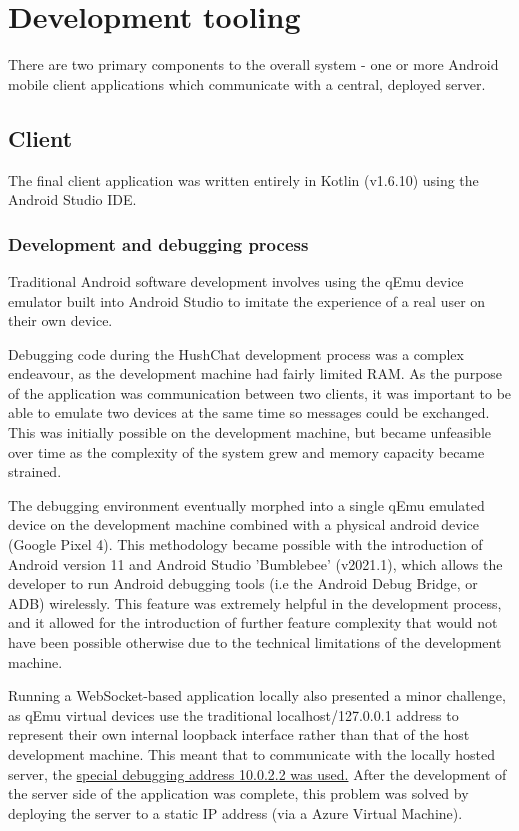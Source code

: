 \documentclass{mproj}
\begin{document}
\section{Development tooling}
There are two primary components to the overall system - one or more Android mobile client applications which communicate with a central, deployed server.


\subsection{Client}
The final client application was written entirely in Kotlin (v1.6.10) using the Android Studio IDE. 

\subsubsection{Development and debugging process}
Traditional Android software development involves using the qEmu device emulator built into Android Studio to imitate the experience of a real user on their own device. 

Debugging code during the HushChat development process was a complex endeavour, as the development machine had fairly limited RAM. As the purpose of the application was communication between two clients, it was important to be able to emulate two devices at the same time so messages could be exchanged. This was initially possible on the development machine, but became unfeasible over time as the complexity of the system grew and memory capacity became strained. 

The debugging environment eventually morphed into a single qEmu emulated device on the development machine combined with a physical android device (Google Pixel 4). This methodology became possible with the introduction of Android version 11 and Android Studio 'Bumblebee' (v2021.1), which allows the developer to run Android debugging tools (i.e the Android Debug Bridge, or ADB) wirelessly. This feature was extremely helpful in the development process, and it allowed for the introduction of further feature complexity that would not have been possible otherwise due to the technical limitations of the development machine. 

Running a WebSocket-based application locally also presented a minor challenge, as qEmu virtual devices use the traditional localhost/127.0.0.1 address to represent their own internal loopback interface rather than that of the host development machine. This meant that to communicate with the locally hosted server, the \href{https://developer.android.com/studio/run/emulator-networking.html}{special debugging address 10.0.2.2 was used.} After the development of the server side of the application was complete, this problem was solved by deploying the server to a static IP address (via a Azure Virtual Machine).
\end{document}

